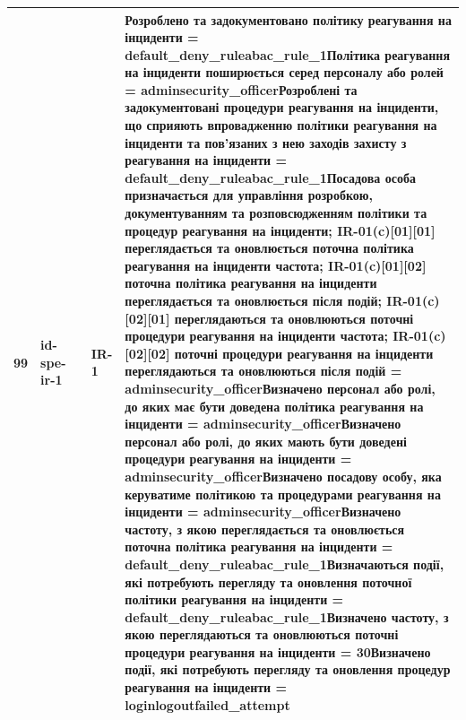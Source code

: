 \documentclass[10pt]{article}
\begin{document}
\begin{longtable}{|c|>{\raggedright\arraybackslash}p{4cm}|>{\raggedright\arraybackslash}p{2.5cm}|>{\raggedright\arraybackslash}p{3.5cm}|>{\raggedright\arraybackslash}p{5.5cm}|}
99 & id-spe-ir-1 &  & IR-1 & Розроблено та задокументовано політику реагування на інциденти = \textbf{default\_\allowbreak{}deny\_\allowbreak{}ruleabac\_\allowbreak{}rule\_\allowbreak{}1}\newline Політика реагування на інциденти поширюється серед персоналу або ролей = \textbf{adminsecurity\_\allowbreak{}officer}\newline Розроблені та задокументовані процедури реагування на інциденти, що сприяють впровадженню політики реагування на інциденти та пов'язаних з нею заходів захисту з реагування на інциденти = \textbf{default\_\allowbreak{}deny\_\allowbreak{}ruleabac\_\allowbreak{}rule\_\allowbreak{}1}\newline Посадова особа призначається для управління розробкою, документуванням та розповсюдженням політики та процедур реагування на інциденти; IR-01(c)[01][01] переглядається та оновлюється поточна політика реагування на інциденти частота; IR-01(c)[01][02] поточна політика реагування на інциденти переглядається та оновлюється після подій; IR-01(c)[02][01] переглядаються та оновлюються поточні процедури реагування на інциденти частота; IR-01(c)[02][02] поточні процедури реагування на інциденти переглядаються та оновлюються після подій = \textbf{adminsecurity\_\allowbreak{}officer}\newline Визначено персонал або ролі, до яких має бути доведена політика реагування на інциденти = \textbf{adminsecurity\_\allowbreak{}officer}\newline Визначено персонал або ролі, до яких мають бути доведені процедури реагування на інциденти = \textbf{adminsecurity\_\allowbreak{}officer}\newline Визначено посадову особу, яка керуватиме політикою та процедурами реагування на інциденти = \textbf{adminsecurity\_\allowbreak{}officer}\newline Визначено частоту, з якою переглядається та оновлюється поточна політика реагування на інциденти = \textbf{default\_\allowbreak{}deny\_\allowbreak{}ruleabac\_\allowbreak{}rule\_\allowbreak{}1}\newline Визначаються події, які потребують перегляду та оновлення поточної політики реагування на інциденти = \textbf{default\_\allowbreak{}deny\_\allowbreak{}ruleabac\_\allowbreak{}rule\_\allowbreak{}1}\newline Визначено частоту, з якою переглядаються та оновлюються поточні процедури реагування на інциденти = \textbf{30}\newline Визначено події, які потребують перегляду та оновлення процедур реагування на інциденти = \textbf{loginlogoutfailed\_\allowbreak{}attempt} \\ \hline

\end{longtable}
\end{document}
